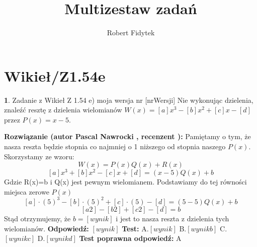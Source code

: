 \documentclass[12pt, a4paper]{article}
\title{Multizestaw zadań}
\author{Robert Fidytek}
\date{}
\theoremstyle{definition} %
\newtheorem{zad}{}
\newcommand{\kategoria}[1]{\section{#1}} %
\newcommand{\zadStart}[1]{\begin{zad}#1\newline} %
\newcommand{\zadStop}{\end{zad}}   %
\newcommand{\rozwStart}[2]{\noindent \textbf{Rozwiązanie (autor #1 , recenzent #2): }\newline} %
\newcommand{\odpStart}{\noindent \textbf{Odpowiedź:}\newline}    %
\newcommand{\odpStop}{\newline}                                             %
\newcommand{\testStart}{\noindent \textbf{Test:}\newline} %
\newcommand{\testStop}{\newline} %
\newcommand{\kluczStart}{\noindent \textbf{Test poprawna odpowiedź:}\newline} %
\newcommand{\kluczStop}{\newline} %
\begin{document}
\maketitle
\kategoria{Wikieł/Z1.54e}
\zadStart{Zadanie z Wikieł Z 1.54 e) moja wersja nr [nrWersji]}
Nie wykonując dzielenia, znaleźć resztę z dzielenia wielomianów $W(x)=[a]x^3-[b]x^2+[c]x-[d]$ przez $P(x)=x-5$.
\zadStop
\rozwStart{Pascal Nawrocki}{}
Pamiętamy o tym, że nasza reszta będzie stopnia co najmniej o 1 niższego od stopnia naszego $P(x)$. Skorzystamy ze wzoru:
$$W(x)=P(x)Q(x)+R(x)$$
$$[a]x^3+[b]x^2-[c]x+[d]=(x-5)Q(x)+b$$
Gdzie R(x)=b i Q(x) jest pewnym wielomianem. Podstawiamy do tej równości miejsca zerowe $P(x)$
$$[a]\cdot(5)^3-[b]\cdot(5)^2+[c]\cdot(5)-[d]=(5-5)Q(x)+b$$
$$[a2]-[b2]+[c2]-[d]=b$$
Stąd otrzymujemy, że $b=[wynik]$ i jest to nasza reszta z dzielenia tych wielomianów.
\odpStart
$[wynik]$
\odpStop
\testStart
A.$[wynik]$
B.$[wynikb]$
C.$[wynikc]$
D.$[wynikd]$
\testStop
\kluczStart
A
\kluczStop
\end{document}
